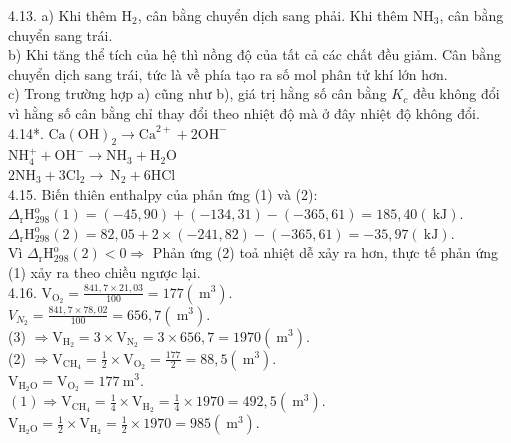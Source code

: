 \documentclass[10pt]{article}
\begin{document}
4.13. a) Khi thêm $\mathrm{H}_{2}$, cân bằng chuyển dịch sang phải. Khi thêm $\mathrm{NH}_{3}$, cân bằng chuyển sang trái.\\
b) Khi tăng thể tích của hệ thì nồng độ của tất cả các chất đều giảm. Cân bằng chuyển dịch sang trái, tức là về phía tạo ra số mol phân tử khí lớn hơn.\\
c) Trong trường hợp a) cũng như b), giá trị hằng số cân bằng $K_{c}$ đều không đổi vì hằng số cân bằng chỉ thay đổi theo nhiệt độ mà ở đây nhiệt độ không đổi.\\
4.14*. $\mathrm{Ca}(\mathrm{OH})_{2} \rightarrow \mathrm{Ca}^{2+}+2 \mathrm{OH}^{-}$\\
$\mathrm{NH}_{4}^{+}+\mathrm{OH}^{-} \rightarrow \mathrm{NH}_{3}+\mathrm{H}_{2} \mathrm{O}$\\
$2 \mathrm{NH}_{3}+3 \mathrm{Cl}_{2} \rightarrow \mathrm{~N}_{2}+6 \mathrm{HCl}$\\
4.15. Biến thiên enthalpy của phản ứng (1) và (2):\\
$\Delta_{\mathrm{r}} \mathrm{H}_{298}^{\mathrm{o}}(1)=(-45,90)+(-134,31)-(-365,61)=185,40(\mathrm{~kJ})$.\\
$\Delta_{\mathrm{r}} \mathrm{H}_{298}^{\mathrm{o}}(2)=82,05+2 \times(-241,82)-(-365,61)=-35,97(\mathrm{~kJ})$.\\
Vì $\Delta_{\mathrm{r}} \mathrm{H}_{298}^{\mathrm{o}}(2)<0 \Rightarrow$ Phản ứng (2) toả nhiệt dễ xảy ra hơn, thực tế phản ứng (1) xảy ra theo chiều ngược lại.\\
4.16. $\mathrm{V}_{\mathrm{O}_{2}}=\frac{841,7 \times 21,03}{100}=177\left(\mathrm{~m}^{3}\right)$.\\
$V_{N_{2}}=\frac{841,7 \times 78,02}{100}=656,7\left(\mathrm{~m}^{3}\right)$.\\
(3) $\Rightarrow \mathrm{V}_{\mathrm{H}_{2}}=3 \times \mathrm{V}_{\mathrm{N}_{2}}=3 \times 656,7=1970\left(\mathrm{~m}^{3}\right)$.\\
(2) $\Rightarrow \mathrm{V}_{\mathrm{CH}_{4}}=\frac{1}{2} \times \mathrm{V}_{\mathrm{O}_{2}}=\frac{177}{2}=88,5\left(\mathrm{~m}^{3}\right)$.\\
$\mathrm{V}_{\mathrm{H}_{2} \mathrm{O}}=\mathrm{V}_{\mathrm{O}_{2}}=177 \mathrm{~m}^{3}$.\\
$(1) \Rightarrow \mathrm{V}_{\mathrm{CH}_{4}}=\frac{1}{4} \times \mathrm{V}_{\mathrm{H}_{2}}=\frac{1}{4} \times 1970=492,5\left(\mathrm{~m}^{3}\right)$.\\
$\mathrm{V}_{\mathrm{H}_{2} \mathrm{O}}=\frac{1}{2} \times \mathrm{V}_{\mathrm{H}_{2}}=\frac{1}{2} \times 1970=985\left(\mathrm{~m}^{3}\right)$.\\
\end{document}
